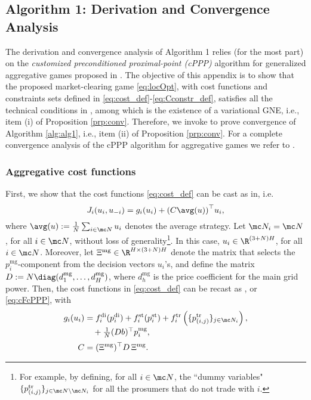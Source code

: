 \subsection{Algorithm 1: Derivation and Convergence Analysis}
\label{app:CA}
The derivation and convergence analysis of Algorithm 1 relies (for the most part) on the \textit{customized preconditioned proximal-point (cPPP)} algorithm for generalized aggregative games proposed in \cite[Algorithm~6]{belgioioso2020semi}. The objective of this appendix is to show that the proposed market-clearing game \eqref{eq:locOpt}, with cost functions and constraints sets defined in \eqref{eq:cost_def}-\eqref{eq:Cconstr_def}, satisfies all the technical conditions in \cite[Theorem~2]{belgioioso2020semi}, among which is the existence of a variational GNE, i.e., item (i) of Proposition \ref{prp:conv}. Therefore, we invoke \cite[Theorem~2]{belgioioso2020semi} to prove convergence of Algorithm \ref{alg:alg1}, i.e., item (ii) of Proposition \ref{prp:conv}. For a complete convergence analysis of the cPPP algorithm for aggregative games we refer to \cite[Appendix~C]{belgioioso2020semi}.

\smallskip
\subsubsection*{Aggregative cost functions} First, we show that the cost functions \eqref{eq:cost_def} can be cast as in\cite[Eqn.~(30)]{belgioioso2020semi}, i.e.
\begin{equation}
	\label{eq:cFcPPP}
	J_i(u_i, u_{-i}) = g_i(u_i) + {(C \avg( u))}^\top u_i,
\end{equation}
where $\avg( u) := \frac{1}{N}\sum_{i \in \mc N} u_i$ denotes the average strategy.
Let $\mc N_i = \mc N$, for all $i \in \mc N$, without loss of generality\footnote{For example, by defining, for all $i \in \mc N$, the ``dummy variables" $\{p^{\text{tr}}_{(i,j)}\}_{j \in \mc N \setminus {\mc N_i}}$ for all the prosumers that do not trade with $i$.}. In this case, $u_i \in \R^{(3+N)H}$, for all $i \in \mc N$. Moreover, let $\Xi^{\text{mg}} \in \R^{H \times (3+N)H}$ denote the matrix that selects the $p_{i}^{\text{mg}}$-component from the decision vectors $u_i$'s, and define the matrix $D:= N \diag(d^{\text{mg}}_1, \ldots, d^{\text{mg}}_H)$, where $d^{\text{mg}}_h$ is the price coefficient for the main grid power. Then, the cost functions in \eqref{eq:cost_def} can be recast as \cite[Eqn.~(30)]{belgioioso2020semi}, or \eqref{eq:cFcPPP}, with
\begin{subequations}
	\label{eq:pieces_cPPP}
	\begin{align}
		g_i(u_i) &= \nonumber
		f_{i}^{\mathrm{di}}(p_{i}^{\mathrm{di}}) + f_{i}^{\mathrm{st}}(p_{i}^{\mathrm{st}})+ f_{i}^{\mathrm{tr}} \left( \{ p_{(i,j)}^{\mathrm{tr}} \}_{j \in \mc N_i} \right),\\[-.2em]
		\label{eq:gi_cPPP}
		&
		\textstyle
		\quad +\frac{1}{N}(Db)^\top p_i^{\text{mg}},\\[.2em]
		C &= (\Xi^{\text{mg}})^\top D \, \Xi^{\text{mg}}.
		\label{eq:C_cPPP}
	\end{align}
\end{subequations}


